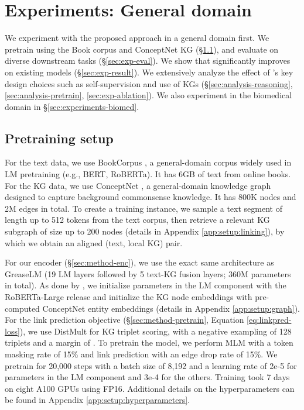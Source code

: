 \section{Experiments: General domain}
\label{sec:experiments}
We experiment with the proposed approach \methodname in a general domain first. We pretrain \methodname using the Book corpus and ConceptNet KG (\S \ref{sec:exp-pretrain-setup}), and evaluate on diverse downstream tasks (\S \ref{sec:exp-eval}). We show that \methodname significantly improves on existing models (\S \ref{sec:exp-result}). We extensively analyze the effect of \methodname's key design choices such as self-supervision and use of KGs (\S \ref{sec:analysis-reasoning}, \ref{sec:analysis-pretrain}, \ref{sec:exp-ablation}).
We also experiment in the biomedical domain in \S \ref{sec:experiments-biomed}. 


\subsection{Pretraining setup}
\label{sec:exp-pretrain-setup}

For the text data, we use BookCorpus \cite{Zhu_2015_ICCV}, a general-domain corpus widely used in LM pretraining (e.g., BERT, RoBERTa). It has 6GB of text from online books.
For the KG data, we use {ConceptNet} \citep{speer2016conceptnet}, a general-domain knowledge graph designed to capture background commonsense knowledge. It has 800K nodes and 2M edges in total.
To create a training instance, we sample a text segment of length up to 512 tokens from the text corpus, then retrieve a relevant KG subgraph of size up to 200 nodes (details in Appendix \ref{app:setup:linking}), by which we obtain an aligned (text, local KG) pair.


For our encoder (\S \ref{sec:method-enc}), we use the exact same architecture as GreaseLM \cite{zhang2022greaselm} (19 LM layers followed by 5 text-KG fusion layers; 360M parameters in total). As done by \cite{zhang2022greaselm}, we initialize parameters in the LM component with the RoBERTa-Large release \cite{liu2019roberta} and initialize the KG node embeddings with pre-computed ConceptNet entity embeddings (details in Appendix \ref{app:setup:graph}). 
For the link prediction objective (\S \ref{sec:method-pretrain}, Equation \ref{eq:linkpred-loss}), we use DistMult \cite{yang2015embedding} for KG triplet scoring, with a negative exampling of 128 triplets and a margin of .
To pretrain the model, we perform MLM with a token masking rate of 15\% and link prediction with an edge drop rate of 15\%.
We pretrain for 20,000 steps with a batch size of 8,192 and a learning rate of 2e-5 for parameters in the LM component and 3e-4 for the others. 
Training took 7 days on eight A100 GPUs using FP16.
Additional details on the hyperparameters can be found in Appendix \ref{app:setup:hyperparameters}.





